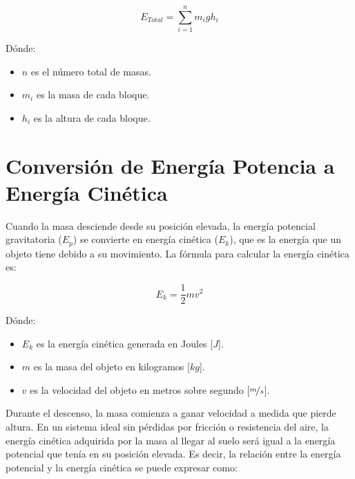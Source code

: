         \begin{equation}
            E_{Total} = \sum_{i=1}^{n} m_igh_i
        \end{equation}

        Dónde:\par

        \begin{itemize} [label=•]
            \setlength{\itemindent}{1.5em}
            
            \item $n$ es el número total de masas.
            \item $m_i$ es la masa de cada bloque.
            \item $h_i$ es la altura de cada bloque.
        \end{itemize}

    \section{Conversión de Energía Potencia a Energía Cinética}

        Cuando la masa desciende desde su posición elevada, la energía potencial gravitatoria ($E_p$) se convierte en energía cinética ($E_k$), que es la energía que un objeto tiene debido a su movimiento. La fórmula para calcular la energía cinética es:

        \begin{equation}
            E_k = \frac{1}{2} m v^2
        \end{equation}

        Dónde:
        \begin{itemize} [label=•]
            \setlength{\itemindent}{1.5em}
            
            \item $E_k$ es la energía cinética generada en Joules [$J$].
            \item $m$ es la masa del objeto en kilogramos [$kg$].
            \item $v$ es la velocidad del objeto en metros sobre segundo [$\nicefrac{m}{s}$].
        \end{itemize}

        Durante el descenso, la masa comienza a ganar velocidad a medida que pierde altura. En un sistema ideal sin pérdidas por fricción o resistencia del aire, la energía cinética adquirida por la masa al llegar al suelo será igual a la energía potencial que tenía en su posición elevada. Es decir, la relación entre la energía potencial y la energía cinética se puede expresar como:\par


